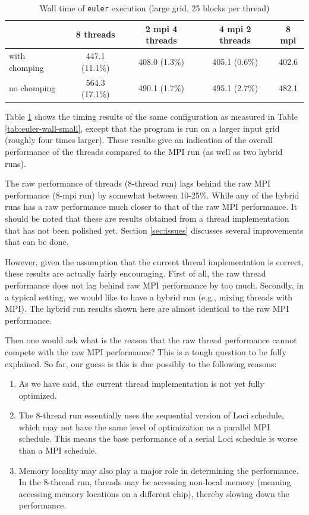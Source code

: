 \documentclass{article}
\begin{document}
\begin{table}[h]
  \begin{center}
    \caption{Wall time of \texttt{euler} execution (large grid, 25 blocks per thread)\label{tab:euler-wall-large}}
    \begin{tabular}{|l|c|c|c|c|}
      \hline
      & 8 threads & 2 mpi 4 threads & 4 mpi 2 threads & 8 mpi\\
      \hline
      with chomping & 447.1 (11.1\%) & 408.0 (1.3\%) & 405.1 (0.6\%) &
      402.6\\ 
      no chomping & 564.3 (17.1\%) & 490.1 (1.7\%) & 495.1 (2.7\%) &
      482.1\\
      \hline
    \end{tabular}
  \end{center}
\end{table}

Table \ref{tab:euler-wall-large} shows the timing results of the same
configuration as measured in Table \ref{tab:euler-wall-small}, except
that the program is run on a larger input grid (roughly four times
larger).  These results give an indication of the overall performance of
the threads compared to the MPI run (as well as two hybrid runs).

The raw performance of threads (8-thread run) lags behind the raw MPI
performance (8-mpi run) by somewhat between 10-25\%.  While any of the
hybrid runs has a raw performance much closer to that of the raw MPI
performance.  It should be noted that these are results obtained from a
thread implementation that has not been polished yet.  Section
\ref{sec:issues} discusses several improvements that can be done.

However, given the assumption that the current thread implementation is
correct, these results are actually fairly encouraging.  First of all,
the raw thread performance does not lag behind raw MPI performance by
too much.  Secondly, in a typical setting, we would like to have a
hybrid run (e.g., mixing threads with MPI).  The hybrid run results
shown here are almost identical to the raw MPI performance.

Then one would ask what is the reason that the raw thread performance
cannot compete with the raw MPI performance?  This is a tough question
to be fully explained.  So far, our guess is this is due possibly to the
following reasons:
\begin{enumerate}
  \item As we have said, the current thread implementation is not yet
    fully optimized.
  \item The 8-thread run essentially uses the sequential version of Loci
    schedule, which may not have the same level of optimization as a
    parallel MPI schedule.  This means the base performance of a serial
    Loci schedule is worse than a MPI schedule.
  \item Memory locality may also play a major role in determining the
    performance.  In the 8-thread run, threads may be accessing
    non-local memory (meaning accessing memory locations on a different
    chip), thereby slowing down the performance. 
\end{enumerate}
\end{document}
